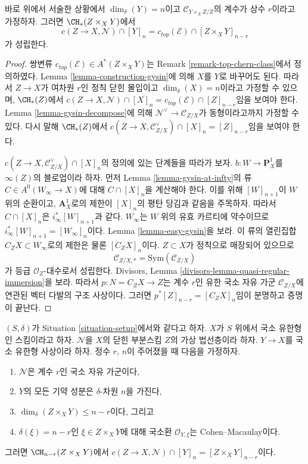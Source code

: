 \begin{lemma}
\label{lemma-gysin-fundamental}
바로 위에서 서술한 상황에서 $\dim_\delta(Y) = n$이고
$\mathcal{C}_{Y \times_X Z/Z}$의 계수가 상수 $r$이라고 가정하자.
그러면 $\CH_*(Z \times_X Y)$에서
$$
c(Z \to X, \mathcal{N}) \cap [Y]_n =
c_{top}(\mathcal{E}) \cap [Z \times_X Y]_{n - r}
$$
가 성립한다.
\end{lemma}

\begin{proof}
쌍변류 $c_{top}(\mathcal{E}) \in A^*(Z \times_X Y)$는 Remark
\ref{remark-top-chern-class}에서 정의하였다. Lemma
\ref{lemma-construction-gysin}에 의해 $X$를 $Y$로 바꾸어도 된다.
따라서 $Z \to X$가 여차원 $r$인 정칙 닫힌 몰입이고
$\dim_\delta(X) = n$이라고 가정할 수 있으며, $\CH_*(Z)$에서
$c(Z \to X, \mathcal{N}) \cap [X]_n =
c_{top}(\mathcal{E}) \cap [Z]_{n - r}$임을 보여야 한다.
Lemma \ref{lemma-gysin-decompose}에 의해
$\mathcal{N}^\vee \to \mathcal{C}_{Z/X}$가 동형이라고까지 가정할 수
있다. 다시 말해 $\CH_*(Z)$에서
$c(Z \to X, \mathcal{C}_{Z/X}^\vee) \cap [X]_n = [Z]_{n - r}$임을
보여야 한다.

\medskip\noindent
$c(Z \to X, \mathcal{C}_{Z/X}^\vee) \cap [X]_n$의 정의에 있는
단계들을 따라가 보자. $b : W \to \mathbf{P}^1_X$를
$\infty(Z)$의 블로업이라 하자. 먼저 Lemma
\ref{lemma-gysin-at-infty}의 류 $C \in A^0(W_\infty \to X)$에 대해
$C \cap [X]_n$을 계산해야 한다. 이를 위해 $[W]_{n + 1}$이
$W$ 위의 순환이고, $\mathbf{A}^1_X$로의 제한이 $[X]_n$의 평탄
당김과 같음을 주목하자. 따라서 $C \cap [X]_n$은
$i_\infty^*[W]_{n + 1}$과 같다. $W_\infty$는 $W$ 위의 유효
카르티에 약수이므로 $i_\infty^*[W]_{n + 1} = [W_\infty]_n$이다.
Lemma \ref{lemma-easy-gysin}을 보라. 이 류의 열린집합
$C_ZX \subset W_\infty$로의 제한은 물론 $[C_ZX]_n$이다.
$Z \subset X$가 정칙으로 매장되어 있으므로
$$
\mathcal{C}_{Z/X, *} = \text{Sym}(\mathcal{C}_{Z/X})
$$
가 등급 $\mathcal{O}_Z$-대수로서 성립한다. Divisors, Lemma
\ref{divisors-lemma-quasi-regular-immersion}을 보라. 따라서
$p : N = C_ZX \to Z$는 계수 $r$인 유한 국소 자유 가군
$\mathcal{C}_{Z/X}$에 연관된 벡터 다발의 구조 사상이다.
그러면 $p^*[Z]_{n - r} = [C_ZX]_n$임이 분명하고 증명이 끝난다.
\end{proof}

\begin{lemma}
\label{lemma-gysin-easy}
$(S, \delta)$가 Situation \ref{situation-setup}에서와 같다고 하자.
$X$가 $S$ 위에서 국소 유한형인 스킴이라고 하자. $\mathcal{N}$을
$X$의 닫힌 부분스킴 $Z$의 가상 법선층이라 하자. $Y \to X$를
국소 유한형 사상이라 하자. 정수 $r$, $n$이 주어졌을 때 다음을
가정하자.
\begin{enumerate}
\item $\mathcal{N}$은 계수 $r$인 국소 자유 가군이다,
\item $Y$의 모든 기약 성분은 $\delta$-차원 $n$을 가진다,
\item $\dim_\delta(Z \times_X Y) \leq n - r$이다, 그리고
\item $\delta(\xi) = n - r$인 $\xi \in Z \times_X Y$에 대해 국소환
$\mathcal{O}_{Y, \xi}$는 Cohen--Macaulay이다.
\end{enumerate}
그러면 $\CH_{n - r}(Z \times_X Y)$에서
$c(Z \to X, \mathcal{N}) \cap [Y]_n = [Z \times_X Y]_{n - r}$이다.
\end{lemma}

